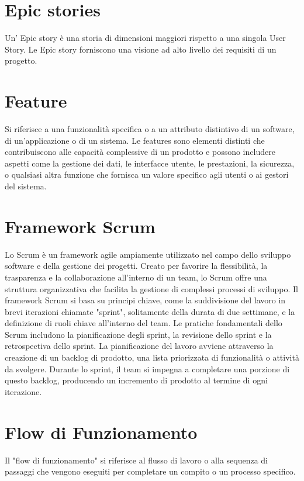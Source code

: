 \documentclass{article}
\begin{document}
\section{Epic stories}
Un' Epic story è una storia di dimensioni maggiori rispetto a una singola User Story.
Le Epic story forniscono una visione ad alto livello dei requisiti di un progetto.

\section{Feature}
Si riferisce a una funzionalità specifica o a un attributo distintivo di un software, di un'applicazione o di un sistema. Le features sono elementi distinti che contribuiscono alle capacità complessive di un prodotto e possono includere aspetti come la gestione dei dati, le interfacce utente, le prestazioni, la sicurezza, o qualsiasi altra funzione che fornisca un valore specifico agli utenti o ai gestori del sistema. 

\section{Framework Scrum}
Lo Scrum è un framework agile ampiamente utilizzato nel campo dello sviluppo software e della gestione dei progetti. Creato per favorire la flessibilità, la trasparenza e la collaborazione all'interno di un team, lo Scrum offre una struttura organizzativa che facilita la gestione di complessi processi di sviluppo. Il framework Scrum si basa su principi chiave, come la suddivisione del lavoro in brevi iterazioni chiamate "sprint", solitamente della durata di due settimane, e la definizione di ruoli chiave all'interno del team. Le pratiche fondamentali dello Scrum includono la pianificazione degli sprint, la revisione dello sprint e la retrospectiva dello sprint. La pianificazione del lavoro avviene attraverso la creazione di un backlog di prodotto, una lista priorizzata di funzionalità o attività da svolgere. Durante lo sprint, il team si impegna a completare una porzione di questo backlog, producendo un incremento di prodotto al termine di ogni iterazione.


\section{Flow di Funzionamento}
 Il "flow di funzionamento" si riferisce al flusso di lavoro o alla sequenza di passaggi che vengono eseguiti per completare un compito o un processo specifico.
\end{document}
